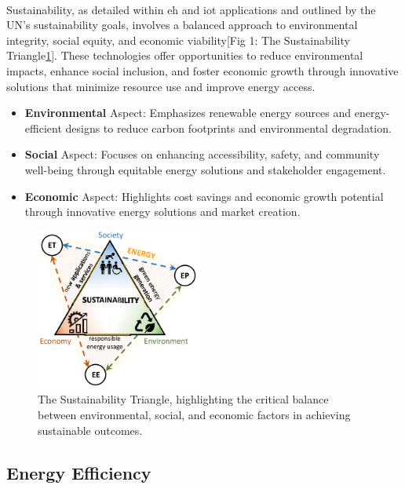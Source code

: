     \paragraph{}
    Sustainability, as detailed within \gls{eh} and \gls{iot} applications and outlined by the UN's sustainability goals, involves a balanced approach to environmental integrity, social equity, and economic viability[Fig 1: The Sustainability Triangle\ref{fig:sustainabilityTriangle}]. These technologies offer opportunities to reduce environmental impacts, enhance social inclusion, and foster economic growth through innovative solutions that minimize resource use and improve energy access.
    \begin{itemize}
        \item \textbf{Environmental} Aspect: Emphasizes renewable energy sources and energy-efficient designs to reduce carbon footprints and environmental degradation.
        \item \textbf{Social} Aspect: Focuses on enhancing accessibility, safety, and community well-being through equitable energy solutions and stakeholder engagement.
        \item \textbf{Economic} Aspect: Highlights cost savings and economic growth potential through innovative energy solutions and market creation.
    \end{itemize}
    
    \begin{figure}[htbp]
        \centering
        \includegraphics[width=0.5\textwidth]{img/005_SustainabilityTriangle.png}
        \caption{The Sustainability Triangle, highlighting the critical balance between environmental, social, and economic factors in achieving sustainable outcomes\cite{EnergySustainableIoT}.}
        \label{fig:sustainabilityTriangle}
    \end{figure}

\newpage
\subsection{Energy Efficiency}

